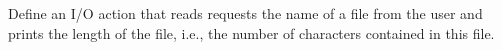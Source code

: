 \begin{exercise}
Define an I/O action  that reads requests the name
of a file from the user and prints the length of the file,
i.e., the number of characters contained in this file.
\end{exercise}



